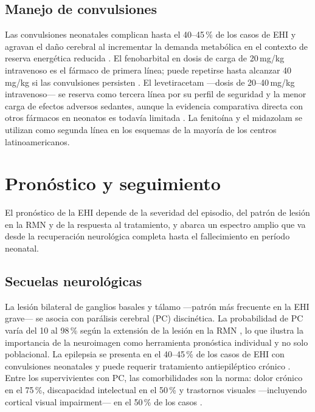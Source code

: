 \documentclass[12pt]{article}
\begin{document}
\subsection{Manejo de convulsiones}
\label{subsec:convulsiones}

Las convulsiones neonatales complican hasta el 40--45\,\% de los casos de EHI y
agravan el daño cerebral al incrementar la demanda metabólica en el contexto de
reserva energética reducida \parencite{volpe2012}. El fenobarbital en dosis de carga
de 20\,mg/kg intravenoso es el fármaco de primera línea; puede repetirse hasta
alcanzar 40\,mg/kg si las convulsiones persisten \parencite{alsepneo2021}. El
levetiracetam ---dosis de 20--40\,mg/kg intravenoso--- se reserva como tercera línea por
su perfil de seguridad y la menor carga de efectos adversos sedantes, aunque la
evidencia comparativa directa con otros fármacos en neonatos es todavía limitada
\parencite{statpearls2024}. La fenitoína y el midazolam se utilizan como segunda línea
en los esquemas de la mayoría de los centros latinoamericanos.

\section{Pronóstico y seguimiento}
\label{sec:pronostico}

El pronóstico de la EHI depende de la severidad del episodio, del patrón de lesión en
la RMN y de la respuesta al tratamiento, y abarca un espectro amplio que va desde la
recuperación neurológica completa hasta el fallecimiento en período neonatal.

\subsection{Secuelas neurológicas}
\label{subsec:secuelas}

La lesión bilateral de ganglios basales y tálamo ---patrón más frecuente en la EHI
grave--- se asocia con parálisis cerebral (PC) discinética. La probabilidad de PC varía
del 10 al 98\,\% según la extensión de la lesión en la RMN \parencite{garciaalix2012},
lo que ilustra la importancia de la neuroimagen como herramienta pronóstica individual
y no solo poblacional. La epilepsia se presenta en el 40--45\,\% de los casos de EHI
con convulsiones neonatales y puede requerir tratamiento antiepiléptico crónico
\parencite{volpe2012}. Entre los supervivientes con PC, las comorbilidades son la norma:
dolor crónico en el 75\,\%, discapacidad intelectual en el 50\,\% y trastornos
visuales ---incluyendo cortical visual impairment--- en el 50\,\% de los casos
\parencite{kurinczuk2010}.
\end{document}
